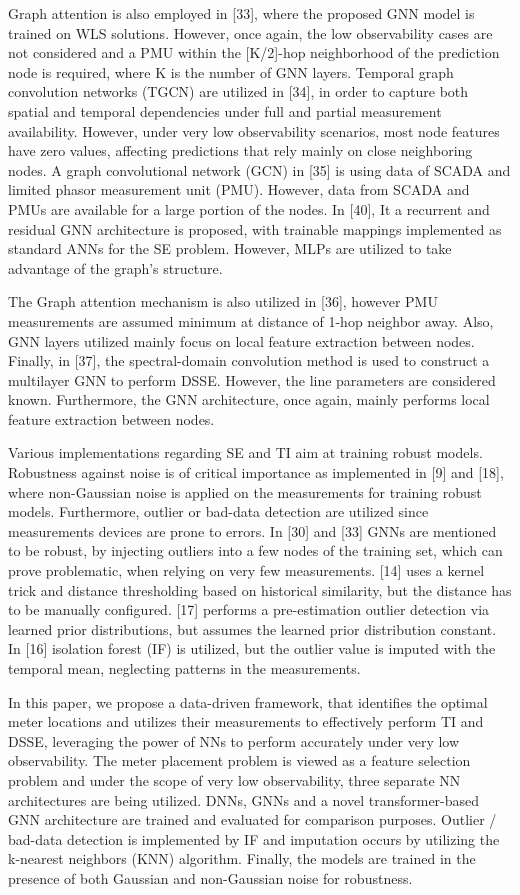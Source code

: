 \documentclass[journal]{IEEEtran}  %
\begin{document}
Graph attention is also employed in [33], where the proposed GNN model is trained on  WLS solutions. However, once again, the low observability cases are not considered and a PMU within the [K/2]-hop neighborhood of the prediction node is required, where K is the number of GNN layers. Temporal graph convolution networks (TGCN) are utilized in [34], in order to capture both spatial and temporal dependencies under full and partial measurement availability. However, under very low observability scenarios, most node features have zero values, affecting predictions that rely mainly on close neighboring nodes. A graph convolutional network (GCN) in [35] is using data of SCADA and limited phasor measurement unit (PMU). However, data from SCADA and PMUs are available for a large portion of the nodes. In [40], It a recurrent and residual GNN architecture is proposed, with trainable mappings implemented as standard ANNs for the SE problem. However, MLPs are utilized to take advantage of the graph's structure.

The Graph attention mechanism is also utilized in [36], however PMU measurements are assumed minimum at distance of 1-hop neighbor away. Also, GNN layers utilized mainly focus on local feature extraction between nodes. Finally, in [37], the spectral-domain convolution method is used to construct a multilayer GNN to perform DSSE. However, the line parameters are considered known. Furthermore, the GNN architecture, once again, mainly performs local feature extraction between nodes.

Various implementations regarding SE and TI aim at training robust models. Robustness against noise is of critical importance as implemented in [9] and [18], where non-Gaussian noise is applied on the measurements for training robust models. Furthermore, outlier or bad-data detection are utilized since measurements devices are prone to errors. In [30] and [33] GNNs are mentioned to be robust, by injecting outliers into a few nodes of the training set, which can prove problematic, when relying on very few measurements. [14] uses a kernel trick and distance thresholding based on historical similarity, but the distance has to be manually configured. [17] performs a pre-estimation outlier detection via learned prior distributions, but assumes the learned prior distribution constant. In [16] isolation forest (IF) is utilized, but the outlier value is imputed with the temporal mean, neglecting patterns in the measurements.

In this paper, we propose a data-driven framework, that identifies the optimal meter locations and utilizes their measurements to effectively perform TI and DSSE, leveraging the power of NNs to perform accurately under very low observability. The meter placement problem is viewed as a feature selection problem and under the scope of very low observability, three separate NN architectures are being utilized. DNNs, GNNs and a novel transformer-based GNN architecture are trained and evaluated for comparison purposes. Outlier / bad-data detection is implemented by IF and imputation occurs by utilizing the k-nearest neighbors (KNN) algorithm. Finally, the models are trained in the presence of both Gaussian and non-Gaussian noise for robustness.
\end{document}
